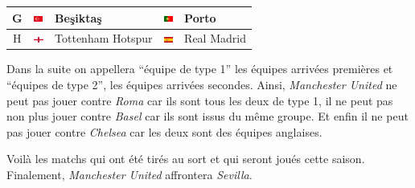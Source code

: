 \documentclass{../ficheTDTP}
\begin{document}
\begin{tabular}{|c|ll|ll|}
G & \includegraphics[height=0.2cm]{flags/tr.png} & Beşiktaş & \includegraphics[height=0.2cm]{flags/po.png} & Porto \\ \hline
H & \includegraphics[height=0.2cm]{flags/en.png} & Tottenham Hotspur & \includegraphics[height=0.2cm]{flags/es.png} & Real Madrid \\ \hline
\end{tabular}

\vspace{0.5cm}

Dans la suite on appellera ``équipe de type 1'' les équipes arrivées premières et ``équipes de type 2'', les équipes arrivées secondes. Ainsi, \textit{Manchester United} ne peut pas jouer contre \textit{Roma} car ils sont tous les deux de type 1, il ne peut pas non plus jouer contre \textit{Basel} car ils sont issus du même groupe. Et enfin il ne peut pas jouer contre \textit{Chelsea} car les deux sont des équipes anglaises. 

Voilà les matchs qui ont été tirés au sort et qui seront joués cette saison. Finalement, \textit{Manchester United} affrontera \textit{Sevilla}. 

\vspace{0.5cm}
\end{document}
